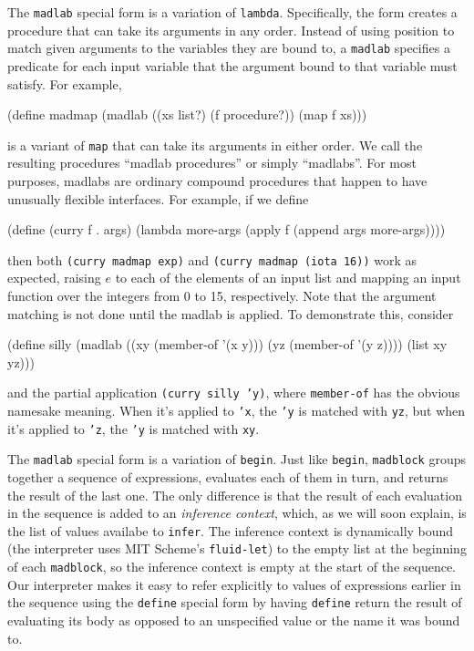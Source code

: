 \documentclass[11pt]{article}
\begin{document}
The \texttt{madlab} special form is a variation of \texttt{lambda}.
Specifically, the form creates a procedure
that can take its arguments in any order.
Instead of using position to match given arguments
to the variables they are bound to,
a \texttt{madlab} specifies a predicate for each input variable
that the argument bound to that variable must satisfy.
For example,
\begin{verbbox}
(define madmap
  (madlab ((xs list?) (f procedure?))
    (map f xs)))
\end{verbbox}
\begin{center}\theverbbox\end{center}
is a variant of \texttt{map} that can take its arguments in either order.
We call the resulting procedures ``madlab procedures'' or simply ``madlabs''.
For most purposes, madlabs are ordinary compound procedures
that happen to have unusually flexible interfaces.
For example, if we define
\begin{verbbox}
(define (curry f . args)
  (lambda more-args
    (apply f (append args more-args))))
\end{verbbox}
\begin{center}\theverbbox\end{center}
then both \texttt{(curry madmap exp)} and
\texttt{(curry madmap (iota 16))} work as expected,
raising $e$ to each of the elements of an input list
and mapping an input function over the integers from 0 to 15, respectively.
Note that the argument matching is not done until the madlab is applied.
To demonstrate this, consider
\begin{verbbox}
(define silly
  (madlab ((xy (member-of '(x y))) (yz (member-of '(y z))))
    (list xy yz)))
\end{verbbox}
\begin{center}\theverbbox\end{center}
and the partial application \texttt{(curry silly 'y)},
where \texttt{member-of} has the obvious namesake meaning.
When it's applied to \texttt{'x},
the \texttt{'y} is matched with \texttt{yz},
but when it's applied to \texttt{'z},
the \texttt{'y} is matched with \texttt{xy}.

The \texttt{madlab} special form is a variation of \texttt{begin}.
Just like \texttt{begin},
\texttt{madblock} groups together a sequence of expressions,
evaluates each of them in turn,
and returns the result of the last one.
The only difference is that the result of each evaluation in the sequence
is added to an \emph{inference context},
which, as we will soon explain,
is the list of values availabe to \texttt{infer}.
The inference context is dynamically bound
(the interpreter uses MIT Scheme's \texttt{fluid-let})
to the empty list at the beginning of each \texttt{madblock},
so the inference context is empty at the start of the sequence.
Our interpreter makes it easy to refer explicitly
to values of expressions earlier in the sequence
using the \texttt{define} special form
by having \texttt{define} return the result of evaluating its body
as opposed to an unspecified value or the name it was bound to.
\end{document}
